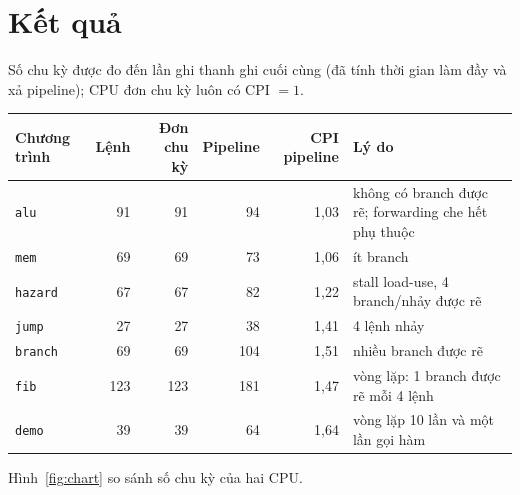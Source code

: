 \documentclass[11pt,a4paper]{article}
\begin{document}
\section{Kết quả}
Số chu kỳ được đo đến lần ghi thanh ghi cuối cùng (đã tính thời gian làm đầy và xả pipeline); CPU đơn chu kỳ luôn có CPI $=1$.
\begin{center}
\small
\begin{tabularx}{\textwidth}{@{}lrrrrX@{}}
\toprule
\textbf{Chương trình} & \textbf{Lệnh} & \textbf{Đơn chu kỳ} & \textbf{Pipeline} & \textbf{CPI pipeline} & \textbf{Lý do}\\
\midrule
\texttt{alu} & 91 & 91 & 94 & 1,03 & không có branch được rẽ; forwarding che hết phụ thuộc\\
\texttt{mem} & 69 & 69 & 73 & 1,06 & ít branch\\
\texttt{hazard} & 67 & 67 & 82 & 1,22 & stall load-use, 4 branch/nhảy được rẽ\\
\texttt{jump} & 27 & 27 & 38 & 1,41 & 4 lệnh nhảy\\
\texttt{branch} & 69 & 69 & 104 & 1,51 & nhiều branch được rẽ\\
\texttt{fib} & 123 & 123 & 181 & 1,47 & vòng lặp: 1 branch được rẽ mỗi 4 lệnh\\
\texttt{demo} & 39 & 39 & 64 & 1,64 & vòng lặp 10 lần và một lần gọi hàm\\
\bottomrule
\end{tabularx}
\end{center}

Hình~\ref{fig:chart} so sánh số chu kỳ của hai CPU.
\end{document}
